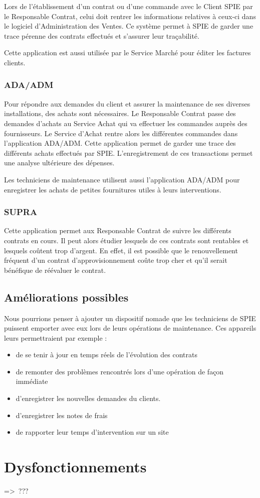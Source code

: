 Lors de l'établissement d'un contrat ou d'une commande avec le Client SPIE par le Responsable Contrat, celui doit rentrer les informations relatives à ceux-ci dans le logiciel d'Administration des Ventes.
Ce système permet à SPIE de garder une trace pérenne des contrats effectués et s'assurer leur traçabilité.

Cette application est aussi utilisée par le Service Marché pour éditer les factures clients.

\subsubsection{ADA/ADM}

Pour répondre aux demandes du client et assurer la maintenance de ses diverses installations, des achats sont nécessaires.
Le Responsable Contrat passe des demandes d'achats au Service Achat qui va effectuer les commandes auprès des fournisseurs.
Le Service d'Achat rentre alors les différentes commandes dans l'application ADA/ADM\@.
Cette application permet de garder une trace des différents achats effectués par SPIE\@.
L'enregistrement de ces transactions permet une analyse ultérieure des dépenses.

Les techniciens de maintenance utilisent aussi l'application ADA/ADM pour enregistrer les achats de petites fournitures utiles à leurs interventions.

\subsubsection{SUPRA}

Cette application permet aux Responsable Contrat de suivre les différents contrats en cours.
Il peut alors étudier lesquels de ces contrats sont rentables et lesquels coûtent trop d'argent.
En effet, il est possible que le renouvellement fréquent d'un contrat d'approvisionnement coûte trop cher et qu'il serait bénéfique de réévaluer le contrat.

\subsection{Améliorations possibles}

Nous pourrions penser à ajouter un dispositif nomade que les techniciens de SPIE puissent emporter avec eux lors de leurs opérations de maintenance.
Ces appareils leurs permettraient par exemple :

\begin{itemize}
\item de se tenir à jour en temps réels de l'évolution des contrats
\item de remonter des problèmes rencontrés lors d'une opération de façon immédiate
\item d'enregistrer les nouvelles demandes du clients.
\item d'enregistrer les notes de frais
\item de rapporter leur temps d'intervention sur un site
\end{itemize}

\section{Dysfonctionnements}

=>~???

